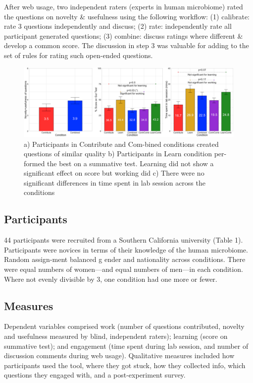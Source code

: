 After web usage, two independent raters (experts in human microbiome) rated the questions on novelty \& usefulness using the following workflow: (1) calibrate: rate 3 questions independently and discuss; (2) rate: independently rate all participant generated questions; (3) combine: discuss ratings where different \& develop a common score. The discussion in step 3 was valuable for adding to the set of rules for rating such open-ended questions. 

\begin{figure}[h] 
  \centering
  \includegraphics[width=1.0\textwidth]{figures/gutinstinct/gi-7.png}
  \caption[]
{a) Participants in Contribute and Com-bined conditions created questions of similar quality b) Participants in Learn condition per-formed the best on a summative test. Learning did not show a significant effect on score but working did c) There were no significant differences in time spent in lab session across the conditions }
  \label{fig:gi-7}
\end{figure}

\subsection{Participants}
44 participants were recruited from a Southern California university (Table 1). Participants were novices in terms of their knowledge of the human microbiome. Random assign-ment balanced g  ender and nationality across conditions. There were equal numbers of women—and equal numbers of men—in each condition. Where not evenly divisible by 3, one condition had one more or fewer. 

\subsection{Measures}
Dependent variables comprised work (number of questions contributed, novelty and usefulness measured by blind, independent raters); learning (score on summative test); and engagement (time spent during lab session, and number of discussion comments during web usage). Qualitative measures included how participants used the tool, where they got stuck, how they collected info, which questions they engaged with, and a post-experiment survey.

